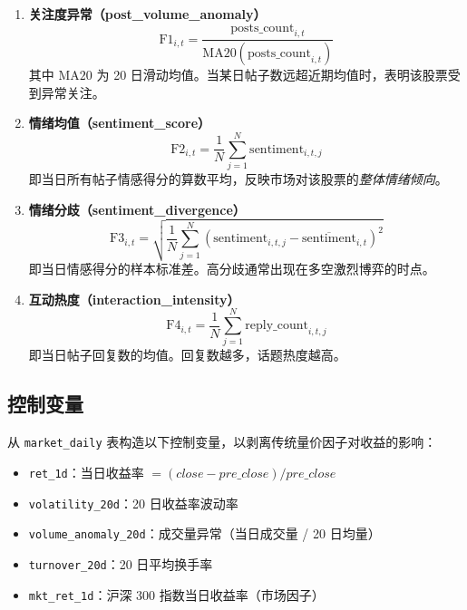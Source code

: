 \documentclass[12pt,a4paper]{ctexart}
\begin{document}
\begin{enumerate}[label=\textbf{F\arabic*}, leftmargin=*]
    \item \textbf{关注度异常（post\_volume\_anomaly）}
    \begin{equation}
        \text{F1}_{i,t} = \frac{\text{posts\_count}_{i,t}}{\text{MA20}(\text{posts\_count}_{i,t})}
    \end{equation}
    其中 $\text{MA20}$ 为 20 日滑动均值。当某日帖子数远超近期均值时，表明该股票受到异常关注。

    \item \textbf{情绪均值（sentiment\_score）}
    \begin{equation}
        \text{F2}_{i,t} = \frac{1}{N}\sum_{j=1}^{N} \text{sentiment}_{i,t,j}
    \end{equation}
    即当日所有帖子情感得分的算数平均，反映市场对该股票的\emph{整体情绪倾向}。

    \item \textbf{情绪分歧（sentiment\_divergence）}
    \begin{equation}
        \text{F3}_{i,t} = \sqrt{\frac{1}{N}\sum_{j=1}^{N}(\text{sentiment}_{i,t,j} - \overline{\text{sentiment}}_{i,t})^2}
    \end{equation}
    即当日情感得分的样本标准差。高分歧通常出现在多空激烈博弈的时点。

    \item \textbf{互动热度（interaction\_intensity）}
    \begin{equation}
        \text{F4}_{i,t} = \frac{1}{N}\sum_{j=1}^{N} \text{reply\_count}_{i,t,j}
    \end{equation}
    即当日帖子回复数的均值。回复数越多，话题热度越高。
\end{enumerate}

\subsection{控制变量}

从 \texttt{market\_daily} 表构造以下控制变量，以剥离传统量价因子对收益的影响：

\begin{itemize}
    \item \texttt{ret\_1d}：当日收益率 $= (close - pre\_close) / pre\_close$
    \item \texttt{volatility\_20d}：20 日收益率波动率
    \item \texttt{volume\_anomaly\_20d}：成交量异常（当日成交量 / 20 日均量）
    \item \texttt{turnover\_20d}：20 日平均换手率
    \item \texttt{mkt\_ret\_1d}：沪深 300 指数当日收益率（市场因子）
\end{itemize}
\end{document}
